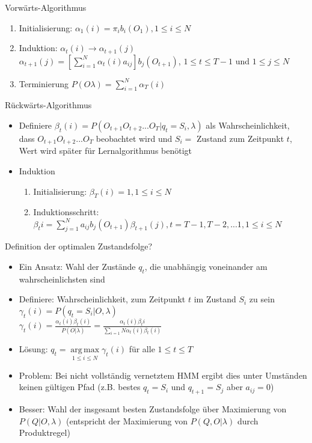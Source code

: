 \documentclass[paper=a4, fontsize=11pt]{scrartcl} %
\numberwithin{equation}{section} %
\numberwithin{figure}{section} %
\numberwithin{table}{section} %
\DeclareMathOperator*{\argmax}{arg\,max}
\begin{document}
Vorwärts-Algorithmus
\begin{enumerate}
\item Initialisierung: $\alpha_1(i) = \pi_i b_i(O_1), 1 \le i \le N$
\item Induktion: $\alpha_t(i) \rightarrow \alpha_{t+1}(j)$\\ $\alpha_{t+1}(j) = [\sum\limits_{i=1}^N \alpha_t(i) a_{ij}] b_j(O_{t+1})$, $1 \le t \le T-1$ und $1 \le j \le N$
\item Terminierung $P(O\lambda) = \sum\limits_{i=1}^N \alpha_T(i)$
\end{enumerate}

Rückwärts-Algorithmus
\begin{itemize}
\item Definiere $\beta_t(i) = P(O_{t+1} O_{t+2}...O_T |q_t = S_i,\lambda)$ als Wahrscheinlichkeit, dass $O_{t+1} O_{t+2}...O_T$ beobachtet wird und $S_i = $ Zustand zum Zeitpunkt $t$, Wert wird später für Lernalgorithmus benötigt
\item Induktion
\begin{enumerate}
\item Initialisierung: $\beta_T(i) = 1, 1 \le i \le N$
\item Induktionsschritt: $\beta_t{i} = \sum\limits_{j=1}^N a_{ij} b_j(O_{t+1}) \beta_{t+1}(j), t = T-1,T-2,...1, 1 \le i \le N$
\end{enumerate}
\end{itemize}
Definition der optimalen Zustandsfolge?
\begin{itemize}
\item Ein Ansatz: Wahl der Zustände $q_t$, die unabhängig voneinander am wahrscheinlichsten sind
\item Definiere: Wahrscheinlichkeit, zum Zeitpunkt $t$ im Zustand $S_i$ zu sein\\ 
$\gamma_t(i) = P(q_t = S_i|O,\lambda)$\\ 
$\gamma_t(i) = \frac{\alpha_t(i)\beta_t(i)}{P(O|\lambda)} = \frac{\alpha_t(i)\beta_t{i}}{\sum\limits_{i=1}{N} \alpha_t(i) \beta_t(i)}$
\item Lösung: $q_t = \argmax\limits_{1 \le i \le N} \gamma_t(i)$ für alle $1 \le t \le T$
\item Problem: Bei nicht vollständig vernetztem HMM ergibt dies unter Umständen keinen gültigen Pfad (z.B. bestes $q_t = S_i$ und $q_{t+1} = S_j$ aber $a_{ij} = 0$)
\item Besser: Wahl der insgesamt besten Zustandsfolge über Maximierung von $P(Q|O,\lambda)$ (entspricht der Maximierung von $P(Q,O|\lambda)$ durch Produktregel)
\end{itemize}
\end{document}
